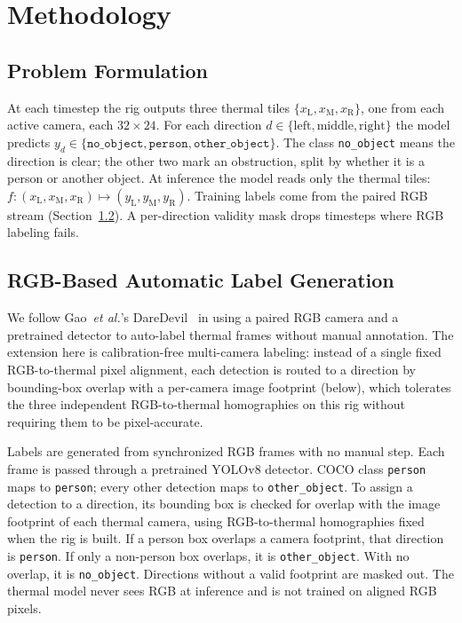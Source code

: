 \section{Methodology}


\subsection{Problem Formulation}

At each timestep the rig outputs three thermal tiles
$\{x_{\text{L}}, x_{\text{M}}, x_{\text{R}}\}$, one from each active camera,
each $32\times24$. For each direction
$d \in \{\text{left}, \text{middle}, \text{right}\}$ the model predicts
$y_d \in \{\texttt{no\_object}, \texttt{person}, \texttt{other\_object}\}$.
The class \texttt{no\_object} means the direction is clear; the other two mark an
obstruction, split by whether it is a person or another object. At inference
the model reads only the thermal tiles:
$f: (x_{\text{L}}, x_{\text{M}}, x_{\text{R}}) \mapsto (y_{\text{L}},
y_{\text{M}}, y_{\text{R}})$.
Training labels come from the paired RGB stream (Section~\ref{sec:labels}). A
per-direction validity mask drops timesteps where RGB labeling fails.

\subsection{RGB-Based Automatic Label Generation}
\label{sec:labels}

We follow Gao~\textit{et al.}'s DareDevil~\cite{gao2025daredevil} in using a
paired RGB camera and a pretrained detector to auto-label thermal frames
without manual annotation. The extension here is calibration-free multi-camera
labeling: instead of a single fixed RGB-to-thermal pixel alignment, each
detection is routed to a direction by bounding-box overlap with a per-camera
image footprint (below), which tolerates the three independent RGB-to-thermal
homographies on this rig without requiring them to be pixel-accurate.

Labels are generated from synchronized RGB frames with no manual step. Each
frame is passed through a pretrained YOLOv8 detector. COCO class
\texttt{person} maps to \texttt{person}; every other detection maps to
\texttt{other\_object}. To assign a detection to a direction, its bounding box
is checked for overlap with the image footprint of each thermal camera, using
RGB-to-thermal homographies fixed when the rig is built. If a person box
overlaps a camera footprint, that direction is \texttt{person}. If only a
non-person box overlaps, it is \texttt{other\_object}. With no overlap, it is
\texttt{no\_object}. Directions without a valid footprint are masked out. The
thermal model never sees RGB at inference and is not trained on aligned RGB
pixels.

